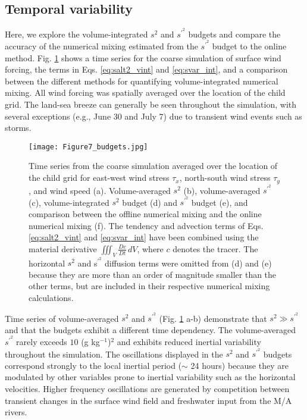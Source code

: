 \documentclass[draft]{agujournal2019}
\begin{document}
\subsection{Temporal variability}

Here, we explore the volume-integrated $s^2$ and $s^{\prime^2}$ budgets and compare the accuracy of the numerical mixing estimated from the $s^{\prime^2}$ budget to the online method. Fig. \ref{fig:budget_comparison} shows a time series for the coarse simulation of surface wind forcing, the terms in Eqs. \ref{eq:salt2_vint} and \ref{eq:svar_int}, and a comparison between the different methods for quantifying volume-integrated numerical mixing. All wind forcing was spatially averaged over the location of the child grid. The land-sea breeze can generally be seen throughout the simulation, with several exceptions (e.g., June 30 and July 7) due to transient wind events such as storms. 

\begin{figure}
 \centerline{\texttt{[image: Figure7\_budgets.jpg]}}
  \caption{Time series from the coarse simulation averaged over the location of the child grid for east-west wind stress $\tau_x$, north-south wind stress $\tau_y$, and wind speed (a). Volume-averaged $s^2$ (b), volume-averaged $s^{\prime^2}$ (c), volume-integrated $s^2$ budget (d) and $s^{\prime^2}$ budget (e), and comparison between the offline numerical mixing and the online numerical mixing (f). The tendency and advection terms of Eqs. \ref{eq:salt2_vint} and \ref{eq:svar_int} have been combined using the material derivative $\iiint_V \frac{Dc}{Dt} \, dV$, where $c$ denotes the tracer. The horizontal $s^2$ and s$^{\prime^2}$ diffusion terms were omitted from (d) and (e) because they are more than an order of magnitude smaller than the other terms, but are included in their respective numerical mixing calculations.}
  \label{fig:budget_comparison}
\end{figure}

Time series of volume-averaged $s^2$ and $s^{\prime^2}$ (Fig. \ref{fig:budget_comparison} a-b) demonstrate that $s^2\gg s^{\prime^2}$ and that the budgets exhibit a different time dependency. The volume-averaged $s^{\prime^2}$ rarely exceeds $10$ (g kg$^{-1}$)$^2$ and exhibits reduced inertial variability throughout the simulation. The oscillations displayed in the $s^2$ and $s^{\prime^2}$ budgets correspond strongly to the local inertial period ($\sim$ 24 hours) because they are modulated by other variables prone to inertial variability such as the horizontal velocities. Higher frequency oscillations are generated by competition between transient changes in the surface wind field and freshwater input from the M/A rivers. 
\end{document}
